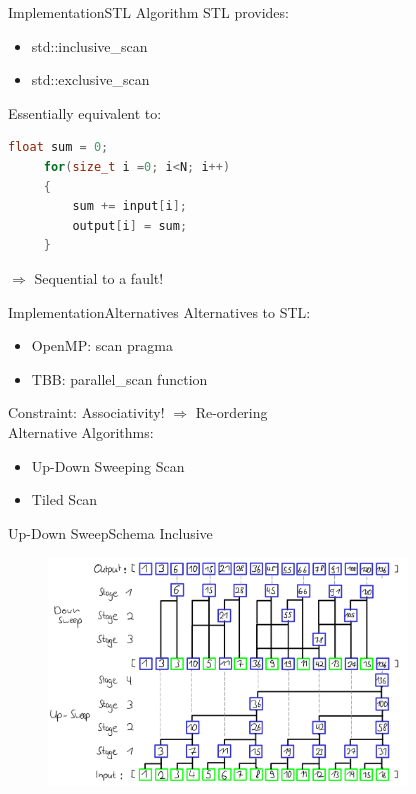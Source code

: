 \begin{frame}[fragile]{Implementation}{STL Algorithm}
    STL provides:
    \begin{itemize}
        \item std::inclusive\_scan
        \item std::exclusive\_scan
    \end{itemize}
    \vspace{10pt}
    Essentially equivalent to:\\
    
     \begin{lstlisting}[language=C++, frame=single, gobble=4]
     float sum = 0;
     for(size_t i =0; i<N; i++)
     {
         sum += input[i];
         output[i] = sum;
     }
     \end{lstlisting}
    \begin{center} $\Rightarrow$ Sequential to a fault! \end{center}
 
\end{frame} 

\begin{frame}{Implementation}{Alternatives}
    Alternatives to STL:
    \begin{itemize}
        \item OpenMP: scan pragma
        \item TBB: parallel\_scan function
    \end{itemize}
    \vspace{10pt}
    Constraint: Associativity! $\Rightarrow$ Re-ordering\\
    \vspace{10pt}
    Alternative Algorithms:
    \begin{itemize}
     \item Up-Down Sweeping Scan
     \item Tiled Scan
    \end{itemize}
\end{frame} 

\begin{frame}{Up-Down Sweep}{Schema Inclusive}
 \begin{figure}
  \centering
  \includegraphics[width=0.85\textwidth]{wiki/InclusiveUpDown}
 \end{figure}
\end{frame}

